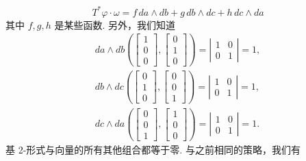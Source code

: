 \[
T^*\varphi\cdot\omega=f\,da\wedge db+g\,db\wedge dc+h\,dc\wedge da
\]
其中 $f,g,h$ 是某些函数. 另外，我们知道
\begin{align*}
da\wedge db\left(\begin{bmatrix}1\\0\\0\end{bmatrix},\begin{bmatrix}0\\1\\0\end{bmatrix}\right)
=\left|\begin{matrix}1&0\\0&1\end{matrix}\right|=1, \\
db\wedge dc\left(\begin{bmatrix}0\\1\\0\end{bmatrix},\begin{bmatrix}0\\0\\1\end{bmatrix}\right)
=\left|\begin{matrix}1&0\\0&1\end{matrix}\right|=1, \\
dc\wedge da\left(\begin{bmatrix}0\\0\\1\end{bmatrix},\begin{bmatrix}1\\0\\0\end{bmatrix}\right)
=\left|\begin{matrix}1&0\\0&1\end{matrix}\right|=1.
\end{align*}
基 2-形式与向量的所有其他组合都等于零. 与之前相同的策略，我们有
